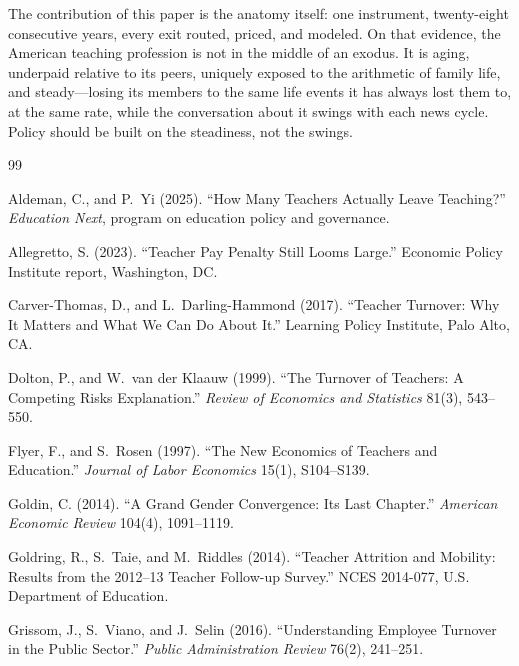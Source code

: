 \documentclass[11pt,a4paper]{article}
\begin{document}
The contribution of this paper is the anatomy itself: one instrument,
twenty-eight consecutive years, every exit routed, priced, and
modeled. On that evidence, the American teaching profession is not in
the middle of an exodus. It is aging, underpaid relative to its peers, uniquely
exposed to the arithmetic of family life, and steady---losing its
members to the same life events it has always lost them to, at the
same rate, while the conversation about it swings with each news
cycle. Policy should be built on the steadiness, not the swings.

\begin{thebibliography}{99}\small

Aldeman, C., and P.~Yi (2025).
``How Many Teachers Actually Leave Teaching?''
\emph{Education Next}, program on education policy and governance.

Allegretto, S. (2023).
``Teacher Pay Penalty Still Looms Large.''
Economic Policy Institute report, Washington, DC.

Carver-Thomas, D., and L.~Darling-Hammond (2017).
``Teacher Turnover: Why It Matters and What We Can Do About It.''
Learning Policy Institute, Palo Alto, CA.

Dolton, P., and W.~van der Klaauw (1999).
``The Turnover of Teachers: A Competing Risks Explanation.''
\emph{Review of Economics and Statistics} 81(3), 543--550.

Flyer, F., and S.~Rosen (1997).
``The New Economics of Teachers and Education.''
\emph{Journal of Labor Economics} 15(1), S104--S139.

Goldin, C. (2014).
``A Grand Gender Convergence: Its Last Chapter.''
\emph{American Economic Review} 104(4), 1091--1119.

Goldring, R., S.~Taie, and M.~Riddles (2014).
``Teacher Attrition and Mobility: Results from the 2012--13 Teacher
Follow-up Survey.'' NCES 2014-077, U.S. Department of Education.

Grissom, J., S.~Viano, and J.~Selin (2016).
``Understanding Employee Turnover in the Public Sector.''
\emph{Public Administration Review} 76(2), 241--251.


\end{thebibliography}
\end{document}
